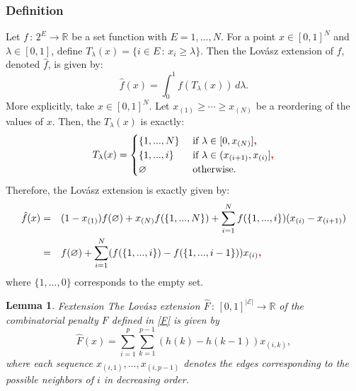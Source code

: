 \documentclass{uwstat572}
\newcommand{\vmadd}[1]{\textbf{\color{red}{#1}}}
\newtheorem{lemma}[theorem]{Lemma}
\theoremstyle{remark}
\theoremstyle{definition}
\begin{document}
\subsubsection{Definition}
Let $f \, : \, 2^E \to \mathbb{R}$ be a set function with $E = {1,...,N}$.  For a point $x \in [0,1]^N$ and $\lambda \in [0,1]$, define $T_{\lambda}(x) = \{i \in E \, : \, x_i \geq \lambda\}$.  Then the Lov{\'a}sz extension of $f$, denoted $\hat{f}$, is given by:
\begin{equation*}
\hat{f}(x) = \int_{0}^1 f( T_{\lambda}(x)) \, d\lambda.
\end{equation*}
More explicitly, take $x \in [0,1]^N$.  Let $x_{(1)} \geq \cdots \geq x_{(N)}$ be a reordering of the values of $x$.  Then, the $T_{\lambda}(x)$ is exactly:
\begin{equation*}
T_{\lambda}(x) = \begin{cases}
\{1,...,N\} & {\text{ if }} \lambda \in [0,x_{(N)}]\vmadd{,}
\\
\{1,...,i\} & {\text{ if }} \lambda \in (x_{(i+1)}, x_{(i)}]\vmadd{,}
\\
\varnothing & {\text{ otherwise}}.
\end{cases}
\end{equation*}
Therefore, the Lov{\'a}sz extension is exactly given by:
\begin{equation}\label{lovasz}
\begin{aligned}
\hat{f}(x) &= &&(1-x_{(1)}) f( \varnothing) + x_{(N)} f(\{1,...,N\})+ \sum_{i=1}^N f(\{1,...,i\})(x_{(i)} - x_{(i+1)}) 
\\
&= && f(\varnothing) + \sum_{i=1}^N (f(\{1,...,i\}) - f(\{1,...,i-1\})) x_{(i)}\vmadd{,}
\end{aligned}
\end{equation}
where $\{1,...,0\}$ corresponds to the empty set.

\begin{lemma}{F\vmadd{-?}extension}
The Lov{\'a}sz extension $\hat{F} \, : \, [0,1]^{|\mathcal{E}|} \to \mathbb{R}$ of the combinatorial penalty $F$ defined in \eqref{F} is given by
\begin{equation}
\hat{F}(x) = \sum_{i=1}^p \sum_{k=1}^{p-1} (h(k) - h(k-1)) x_{(i,k)},
\end{equation}
where each sequence $x_{(i,1)},...,x_{(i,p-1)}$ denotes the edges corresponding to the possible neighbors of $i$ in decreasing order.
\end{lemma}
\end{document}
